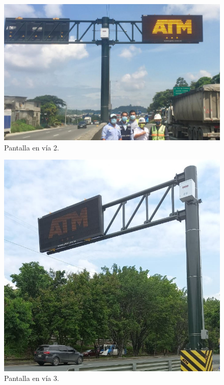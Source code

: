 \begin{figure}[htpb]
	\centering
	\includegraphics[scale=1.5]{Figures/calle2.jpg} 
	\caption{Pantalla en vía 2.}
	\label{fig: calle2}
\end{figure}

\begin{figure}[htpb]
	\centering
	\includegraphics[scale=2]{Figures/calle3.jpg} 
	\caption{Pantalla en vía 3.}
	\label{fig: calle3}
\end{figure}

